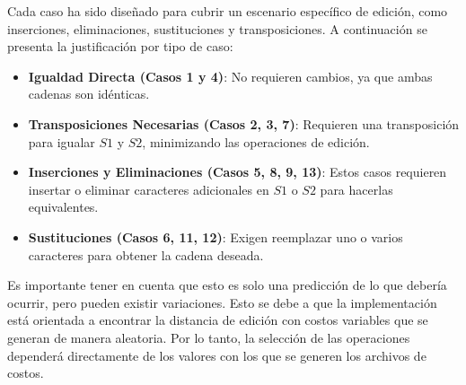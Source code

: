 Cada caso ha sido diseñado para cubrir un escenario específico de edición, como inserciones, eliminaciones, sustituciones y transposiciones. A continuación se presenta la justificación por tipo de caso:

\begin{itemize}
    \item \textbf{Igualdad Directa (Casos 1 y 4)}: No requieren cambios, ya que ambas cadenas son idénticas.
    \item \textbf{Transposiciones Necesarias (Casos 2, 3, 7)}: Requieren una transposición para igualar \( S1 \) y \( S2 \), minimizando las operaciones de edición.
    \item \textbf{Inserciones y Eliminaciones (Casos 5, 8, 9, 13)}: Estos casos requieren insertar o eliminar caracteres adicionales en \( S1 \) o \( S2 \) para hacerlas equivalentes.
    \item \textbf{Sustituciones (Casos 6, 11, 12)}: Exigen reemplazar uno o varios caracteres para obtener la cadena deseada.
\end{itemize}

Es importante tener en cuenta que esto es solo una predicción de lo que debería ocurrir, pero pueden existir variaciones. Esto se debe a que la implementación está orientada a encontrar la distancia de edición con costos variables que se generan de manera aleatoria. Por lo tanto, la selección de las operaciones dependerá directamente de los valores con los que se generen los archivos de costos.
